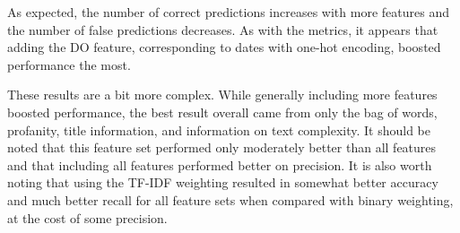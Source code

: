 \documentclass [12 pt] {report}
\begin{document}
As expected, the number of correct predictions increases with more features and the number of false predictions decreases. As with the metrics, it appears that adding the DO feature, corresponding to dates with one-hot encoding, boosted performance the most. 

\vspace*{-2mm}
\begin{table}[H]
\small
{}
\label{table:TFAll, ND}
\end{table}

These results are a bit more complex. While generally including more features boosted performance, the best result overall came from only the bag of words, profanity, title information, and information on text complexity. It should be noted that this feature set performed only moderately better than all features and that including all features performed better on precision. It is also worth noting that using the TF-IDF weighting resulted in somewhat better accuracy and much better recall for all feature sets when compared with binary weighting, at the cost of some precision. 
\end{document}

